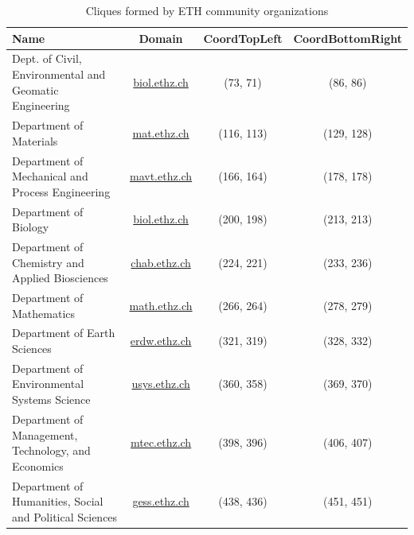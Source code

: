 \documentclass[unicode,11pt,a4paper,oneside,numbers=endperiod,openany]{scrartcl}
\begin{document}
\begin{table}[h!]
    \centering
    \begin{tabular}{||p{2.7in} c c c||}
        \hline
        Name & Domain                                       & CoordTopLeft & CoordBottomRight \\ [0.5ex]
        \hline\hline
        Dept. of Civil, Environmental and Geomatic Engineering
             & \href{http://www.biol.ethz.ch}{biol.ethz.ch}
             & (73, 71)                                     & (86, 86)                        \\

        Department of Materials
             & \href{https://mat.ethz.ch}{mat.ethz.ch}
             & (116, 113)                                   & (129, 128)                      \\

        Department of Mechanical and Process Engineering
             & \href{https://mavt.ethz.ch}{mavt.ethz.ch}
             & (166, 164)                                   & (178, 178)                      \\

        Department of Biology
             & \href{https://biol.ethz.ch}{biol.ethz.ch}
             & (200, 198)                                   & (213, 213)                      \\

        Department of Chemistry and Applied Biosciences
             & \href{https://chab.ethz.ch}{chab.ethz.ch}
             & (224, 221)                                   & (233, 236)                      \\

        Department of Mathematics
             & \href{http://www.math.ethz.ch}{math.ethz.ch}
             & (266, 264)                                   & (278, 279)                      \\

        Department of Earth Sciences
             & \href{http://www.erdw.ethz.ch}{erdw.ethz.ch}
             & (321, 319)                                   & (328, 332)                      \\

        Department of Environmental Systems Science
             & \href{http://www.usys.ethz.ch}{usys.ethz.ch}
             & (360, 358)                                   & (369, 370)                      \\

        Department of Management, Technology, and Economics
             & \href{https://mtec.ethz.ch/}{mtec.ethz.ch}
             & (398, 396)                                   & (406, 407)                      \\

        Department of Humanities, Social and Political Sciences
             & \href{http://www.gess.ethz.ch}{gess.ethz.ch}
             & (438, 436)                                   & (451, 451)                      \\ [1ex]
        \hline
    \end{tabular}
    \caption{Cliques formed by ETH community organizations}
    \label{table:cliques}
\end{table}
\end{document}
